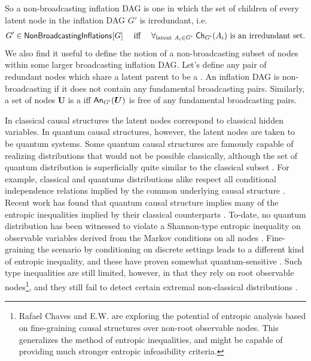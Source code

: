So a non-broadcasting inflation DAG is one in which the set of children of every latent node in the inflation DAG $G'$ is irredundant, i.e.  
\begin{align}\label{eq:nonbroadcastinginflationDAG}
G'\in\SmallNamedFunction{NonBroadcastingInflations}{G} \quad\text{ iff }\quad \forall_{\text{latent }A_i\in G'}\; \Ch[G']{A_i} \text{ is an irredundant set.}
\end{align}
We also find it useful to define the notion of a non-broadcasting subset of nodes within some larger broadcasting inflation DAG.
Let's define any pair of redundant nodes which share a latent parent to be a . An inflation DAG is non-broadcasting if it does not contain any fundamental broadcasting pairs. Similarly, a set of nodes $\bm{U}$ is a  iff $\An[G']{\bm{U}}$ is free of any fundamental broadcasting pairs.


In classical causal structures the latent nodes correspond to classical hidden variables. In quantum causal structures, however, the latent nodes are taken to be quantum systems. Some quantum causal structures are famously capable of realizing distributions that would not be possible classically, although the set of quantum distribution is superficially quite similar to the classical subset \cite{pusey2014gdag,fritz2012bell}. For example, classical and quantums distributions alike respect all conditional independence relations implied by the common underlying causal structure \cite{pusey2014gdag}. Recent work has found that quantum causal structure implies many of the entropic inequalities implied by their classical counterparts \cite{pusey2014gdag,Chaves2015infoquantum,ChavesNoSignalling}. To-date, no quantum distribution has been witnessed to violate a Shannon-type entropic inequality on observable variables derived from the Markov conditions on all nodes \cite{chaves2012entropic,fritz2012bell}. Fine-graining the scenario by conditioning on discrete settings leads to a different kind of entropic inequality, and these have proven somewhat quantum-sensitive \cite{braunstein1988entropic,SchumacherInequality,chaves2014novel}. Such \citet{braunstein1988entropic} type inequalities are still limited, however, in that they rely on root observable nodes\footnote{Rafael Chaves and E.W. are exploring the potential of entropic analysis based on fine-graining causal structures over non-root observable nodes. This generalizes the method of entropic inequalities, and might be capable of providing much stronger entropic infeasibility criteria.}, and they still fail to detect certain extremal non-classical distributions \cite{chaves2014novel,fritz2012bell}.  

